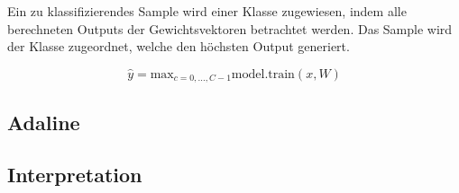 Ein zu klassifizierendes Sample wird einer Klasse zugewiesen, indem alle berechneten Outputs der Gewichtsvektoren betrachtet werden. Das Sample wird der Klasse zugeordnet, welche den höchsten Output generiert.

$$ \hat{y} = \text{max}_{c=0,...,C-1} \text{model.train}(x, W)$$


\newpage
\subsection{Adaline}
\begin{flushleft}
\end{flushleft}

\subsection{Interpretation}
\begin{flushleft}
\end{flushleft}




